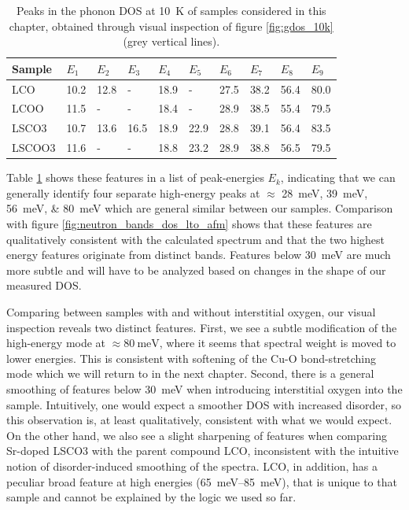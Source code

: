 \begin{table}
    \caption{Peaks in the phonon DOS at \SI{10}{\kelvin} of samples considered in this chapter, obtained through visual inspection of figure \ref{fig:gdos_10k} (grey vertical lines).}
    \label{tab:gdos_features_10K}
    \centering
    \begin{tabular}{llllllllll}
        \toprule
          Sample &  $E_1$ & $E_2$ & $E_3$ &  $E_4$ & $E_5$ &  $E_6$ &  $E_7$ &  $E_8$ &  $E_9$ \\
        \midrule
             LCO &   10.2 &  12.8 &     - &   18.9 &     - &   27.5 &   38.2 &   56.4 &   80.0 \\
            LCOO &   11.5 &     - &     - &   18.4 &     - &   28.9 &   38.5 &   55.4 &   79.5 \\
           LSCO3 &   10.7 &  13.6 &  16.5 &   18.9 &  22.9 &   28.8 &   39.1 &   56.4 &   83.5 \\
         LSCOO3 &   11.6 &     - &     - &   18.8 &  23.2 &   28.9 &   38.8 &   56.5 &   79.5 \\
        \bottomrule
    \end{tabular}
\end{table}

Table \ref{tab:gdos_features_10K} shows these features in a list of peak-energies $E_k$, indicating that we can generally identify four separate high-energy peaks at $\approx$ \SIlist{28;39;56;80}{\milli\eV} which are general similar between our samples. Comparison with figure \ref{fig:neutron_bands_dos_lto_afm} shows that these features are qualitatively consistent with the calculated spectrum and that the two highest energy features originate from distinct bands. Features below \SI{30}{\milli\eV} are much more subtle and will have to be analyzed based on changes in the shape of our measured DOS.

Comparing between samples with and without interstitial oxygen, our visual inspection reveals two distinct features. First, we see a subtle modification of the high-energy mode at $\approx \SI{80}{\milli\eV}$, where it seems that spectral weight is moved to lower energies. This is consistent with softening of the Cu-O bond-stretching mode which we will return to in the next chapter. Second, there is a general smoothing of features below \SI{30}{\milli\eV} when introducing interstitial oxygen into the sample. Intuitively, one would expect a smoother DOS with increased disorder, so this observation is, at least qualitatively, consistent with what we would expect. On the other hand, we also see a slight sharpening of features when comparing Sr-doped LSCO3 with the parent compound LCO, inconsistent with the intuitive notion of disorder-induced smoothing of the spectra. LCO, in addition, has a peculiar broad feature at high energies (\SIrange{65}{85}{\milli\eV}), that is unique to that sample and cannot be explained by the logic we used so far.

